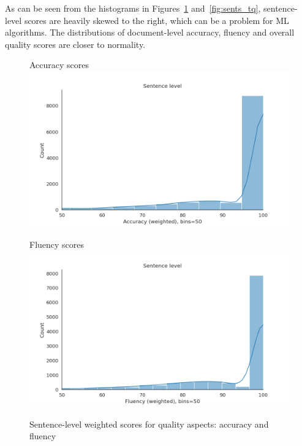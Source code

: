 As can be seen from the histograms in Figures~\ref{fig:sents_weighed_aspects} and~\ref{fig:sents_tq}, sentence-level scores are heavily skewed to the right, which can be a problem for ML algorithms. The distributions of document-level accuracy, fluency and overall quality scores are closer to normality.
\label{pg:skews}
\begin{figure}[H]
	\begin{minipage}[c]{0.5\linewidth}	
		\centering
		Accuracy scores
		\includegraphics[width=\textwidth]{figures/err/sent-accuracy-major2critical5weighted}	
	\end{minipage}
	\begin{minipage}[c]{0.5\linewidth}
		\centering
		Fluency scores
		\includegraphics[width=\textwidth]{figures/err/sent-fluency-major2critical5weighted}
	\end{minipage}
	\caption{\label{fig:sents_weighed_aspects}Sentence-level weighted scores for quality aspects: accuracy and fluency}
\end{figure}

